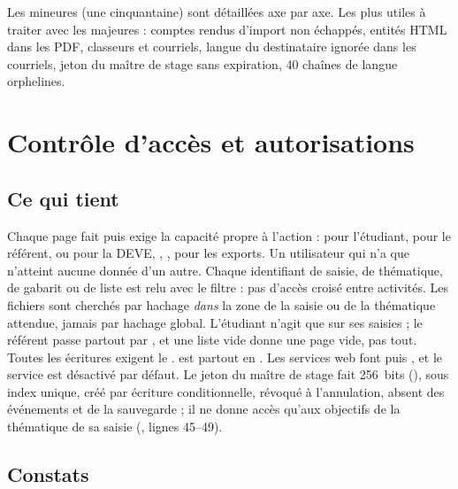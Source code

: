 \documentclass[11pt,a4paper]{article}
\begin{document}
Les mineures (une cinquantaine) sont détaillées axe par axe. Les plus utiles à traiter avec les
majeures : comptes rendus d'import non échappés, entités HTML dans les PDF, classeurs et
courriels, langue du destinataire ignorée dans les courriels, jeton du maître de stage sans
expiration, 40 chaînes de langue orphelines.

\section{Contrôle d'accès et autorisations}

\subsection{Ce qui tient}

Chaque page fait  puis exige la capacité propre à
l'action :  pour l'étudiant,  pour le référent,
 ou  pour la DEVE, ,
,  pour les exports. Un utilisateur qui n'a que
 n'atteint aucune donnée d'un autre. Chaque identifiant de saisie, de
thématique, de gabarit ou de liste est relu avec le filtre  : pas
d'accès croisé entre activités. Les fichiers sont cherchés par hachage \emph{dans} la zone de la
saisie ou de la thématique attendue, jamais par hachage global. L'étudiant n'agit que sur ses
saisies ; le référent passe partout par , et une liste vide
donne une page vide, pas tout. Toutes les écritures exigent le . 
est partout en . Les services web font  puis
, et le service est désactivé par défaut. Le jeton du maître de stage
fait 256~bits (), sous index unique, créé par écriture conditionnelle,
révoqué à l'annulation, absent des événements et de la sauvegarde ; il ne donne accès qu'aux
objectifs de la thématique de sa saisie (, lignes 45--49).

\subsection{Constats}
\end{document}
